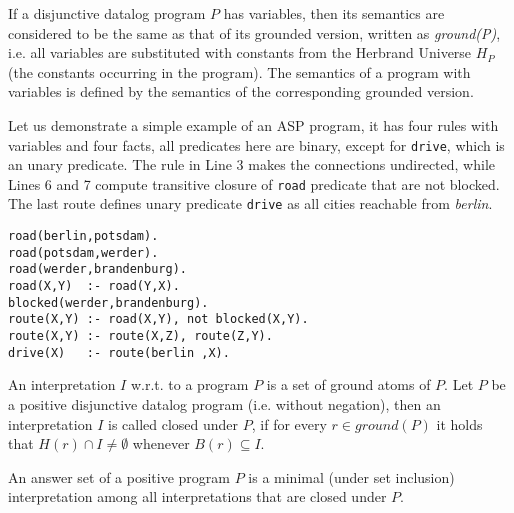 If a disjunctive datalog program $P$ has variables, then its semantics are considered to be the same as that of its grounded version, written as \textit{ground(P)}, i.e. all variables are substituted with constants from the Herbrand Universe $H_P$ (the constants occurring in the program). The semantics of a program with variables is defined by the semantics of the corresponding grounded version.

\begin{example}
Let us demonstrate a simple example of an ASP program, it has four rules with variables and four facts, all predicates here are binary, except for \texttt{drive}, which is an unary predicate. The rule in Line 3 makes the connections undirected, while Lines 6 and 7 compute transitive closure of \texttt{road} predicate that are not blocked. The last route defines unary predicate \texttt{drive} as all cities reachable from \textit{berlin}.
    \begin{lstlisting}[caption=An example of an ASP program (from \textcite{ASPbook}); demonstrate possible route calculations for train connections around Berlin, label=lst:example_asp_program,basicstyle=\ttfamily]
road(berlin,potsdam).
road(potsdam,werder).
road(werder,brandenburg).
road(X,Y)  :- road(Y,X).
blocked(werder,brandenburg).
route(X,Y) :- road(X,Y), not blocked(X,Y).
route(X,Y) :- route(X,Z), route(Z,Y).
drive(X)   :- route(berlin ,X).
\end{lstlisting}
\end{example}

An interpretation $I$ w.r.t. to a program $P$ is a set of ground atoms of $P$. Let $P$ be a positive disjunctive datalog program (i.e. without negation), then an interpretation $I$ is called closed under $P$, if for every $r \in \textit{ground}(P)$ it holds that $H(r) \cap I \ne \emptyset$ whenever $B(r) \subseteq I$. 
\begin{definition}
An answer set of a positive program $P$ is a minimal (under set inclusion) interpretation among all interpretations that are closed under $P$.
\end{definition}

